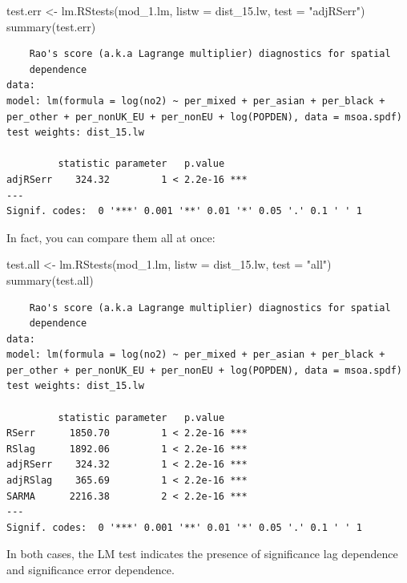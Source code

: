 \documentclass[
  letterpaper,
]{scrbook}
\newenvironment{Shaded}{\begin{snugshade}}{\end{snugshade}}
\newcommand{\AttributeTok}[1]{\textcolor[rgb]{0.40,0.45,0.13}{#1}}
\newcommand{\FunctionTok}[1]{\textcolor[rgb]{0.28,0.35,0.67}{#1}}
\newcommand{\NormalTok}[1]{\textcolor[rgb]{0.00,0.23,0.31}{#1}}
\newcommand{\OtherTok}[1]{\textcolor[rgb]{0.00,0.23,0.31}{#1}}
\newcommand{\StringTok}[1]{\textcolor[rgb]{0.13,0.47,0.30}{#1}}
\begin{document}
\begin{Shaded}
\begin{Highlighting}[]
\NormalTok{test.err }\OtherTok{\textless{}{-}} \FunctionTok{lm.RStests}\NormalTok{(mod\_1.lm, }
                       \AttributeTok{listw =}\NormalTok{ dist\_15.lw, }
                       \AttributeTok{test =} \StringTok{"adjRSerr"}\NormalTok{)}
\FunctionTok{summary}\NormalTok{(test.err)}
\end{Highlighting}
\end{Shaded}

\begin{verbatim}
    Rao's score (a.k.a Lagrange multiplier) diagnostics for spatial
    dependence
data:  
model: lm(formula = log(no2) ~ per_mixed + per_asian + per_black +
per_other + per_nonUK_EU + per_nonEU + log(POPDEN), data = msoa.spdf)
test weights: dist_15.lw
 
         statistic parameter   p.value    
adjRSerr    324.32         1 < 2.2e-16 ***
---
Signif. codes:  0 '***' 0.001 '**' 0.01 '*' 0.05 '.' 0.1 ' ' 1
\end{verbatim}

In fact, you can compare them all at once:

\begin{Shaded}
\begin{Highlighting}[]
\NormalTok{test.all }\OtherTok{\textless{}{-}} \FunctionTok{lm.RStests}\NormalTok{(mod\_1.lm, }
                       \AttributeTok{listw =}\NormalTok{ dist\_15.lw, }
                       \AttributeTok{test =} \StringTok{"all"}\NormalTok{)}
\FunctionTok{summary}\NormalTok{(test.all)}
\end{Highlighting}
\end{Shaded}

\begin{verbatim}
    Rao's score (a.k.a Lagrange multiplier) diagnostics for spatial
    dependence
data:  
model: lm(formula = log(no2) ~ per_mixed + per_asian + per_black +
per_other + per_nonUK_EU + per_nonEU + log(POPDEN), data = msoa.spdf)
test weights: dist_15.lw
 
         statistic parameter   p.value    
RSerr      1850.70         1 < 2.2e-16 ***
RSlag      1892.06         1 < 2.2e-16 ***
adjRSerr    324.32         1 < 2.2e-16 ***
adjRSlag    365.69         1 < 2.2e-16 ***
SARMA      2216.38         2 < 2.2e-16 ***
---
Signif. codes:  0 '***' 0.001 '**' 0.01 '*' 0.05 '.' 0.1 ' ' 1
\end{verbatim}

In both cases, the LM test indicates the presence of significance lag
dependence and significance error dependence.
\end{document}
